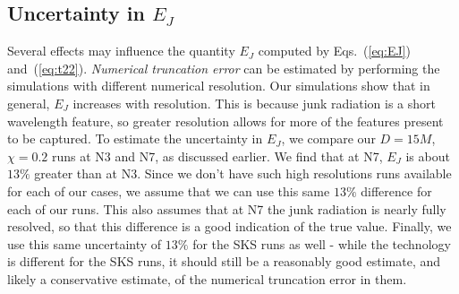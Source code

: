 \subsection{Uncertainty in $E_J$}
\label{subsec:ErrorEstimation}


Several effects may influence the quantity $E_J$ computed by
  Eqs.~(\ref{eq:EJ}) and~(\ref{eq:t22}).  {\it Numerical truncation
    error} can be estimated by performing the simulations with
  different numerical resolution.  Our simulations show that in general,
  $E_J$ increases with resolution. This is because junk radiation is
a short wavelength feature, so greater resolution allows for more of
the features present to be captured.  To estimate the
uncertainty in $E_J$, we compare our $D=15M$,
$\chi=0.2$ runs at N3 and N7, as discussed earlier. We find that
at N7, $E_J$ is about $13\%$ greater than at N3. Since we don't
have such high resolutions runs available for each of our cases, we
assume that we can use this same $13\%$ difference for each of our
runs. This also assumes that at N7 the junk
radiation is nearly fully resolved, so that this difference is a good
indication of the true value. Finally, we use this same uncertainty of
$13\%$ for the SKS runs as well - while the technology is different
for the SKS runs, it should still be a reasonably good estimate, and
likely a conservative estimate, of the numerical truncation error in them.


